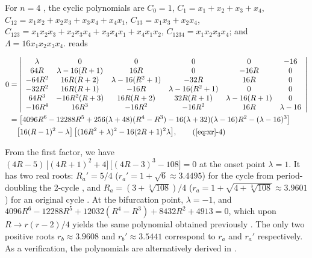 \documentclass[twocolumn]{revtex4-1}
\begin{document}
For $n = 4$ \cite{stephenson, bailey1, kk1, bailey2, lewis},
the cyclic polynomials are
$C_0 = 1$,
$C_1 = x_1 + x_2 + x_3 + x_4$,
$C_{12} = x_1 x_2 + x_2 x_3 + x_3 x_4 + x_4 x_1$,
$C_{13} = x_1 x_3 + x_2 x_4$,
$C_{123} = x_1 x_2 x_3 + x_2 x_3 x_4 + x_3 x_4 x_1 + x_4 x_1 x_2$,
$C_{1234} = x_1 x_2 x_3 x_4$;
and
$\Lambda = 16 x_1 x_2 x_3 x_4$.
%
 reads
%
\begin{widetext}
\begin{align}
0 & = \left|
\begin{array}{cccccc}
 \lambda  & 0               & 0                 & 0     & 0     & -16 \\
 64 R     & \lambda-16(R+1) & 16 R              & 0     & -16R  & 0 \\
 -64 R^2  & 16R(R+2)        & \lambda-16(R^2+1) & -32 R & 16R   & 0 \\
 -32 R^2  & 16R(R+1)        & -16R              & \lambda-16(R^2+1)  & 0 & 0 \\
 64 R^3   & -16R^2(R+3)     & 16R(R+2)        & 32 R (R+1)       & \lambda-16(R+1) & 0 \\
 -16R^4   & 16R^3           & - 16R^2           & -16R^2            & 16R & \lambda - 16
\end{array}
\right | \nonumber  \\
& =
    \big[
    4096 R^6-12288 R^5 + 256 (\lambda + 48) (R^4- R^3)
      -16 (\lambda + 32)(\lambda - 16) R^2
      -(\lambda - 16)^3 \big]  \nonumber \\
& \quad
    \big[ 16 (R-1)^2 - \lambda \big]
 \, \big[(16 R^2 + \lambda)^2 - 16 (2R+1)^2 \lambda \big],
  \tag{\ref{eq:xr}-4}
\label{eq:xr4}
\end{align}
\end{widetext}
%
%
%
From the first factor, we have
$ (
    4R - 5
  )
\, \big[
  (4R + 1)^2 + 4
  \big]
\, \big[
  (4R - 3)^3 - 108
  \big] =0$
at the onset point $\lambda = 1$.
%
%
%
It has two real roots:
$R_a' = 5/4$
\big($r_a' = 1+\sqrt{6} \approx 3.4495$\big)
for the cycle from period-doubling the 2-cycle
  ,
and
$R_a = (3+\sqrt[3]{108})/4$
\big($r_a = 1+\sqrt{4+\sqrt[3]{108}} \approx 3.9601$\big)
for an original cycle .
%
At the bifurcation point, $\lambda = -1$, and
$4096 R^6 - 12288 R^5 + 12032 (R^4 - R^3)
  + 8432 R^2 + 4913 = 0$,
which upon $R \rightarrow r(r-2)/4$ yields the same polynomial
obtained previously
\cite{bailey1, kk1, bailey2, lewis}.
%
%
%
The only two positive roots $r_b \approx 3.9608$
and $r_b' \approx 3.5441$
correspond to $r_a$ and $r_a'$ respectively.
%
As a verification, the polynomials are
alternatively derived in .
\end{document}
